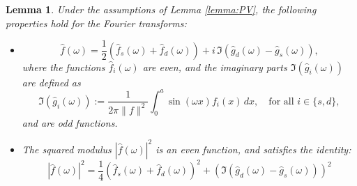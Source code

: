 \documentclass[preprint,hidelinks,authoryear]{elsarticle}
\newtheorem{Lemma}[Thm]{Lemma}
\theoremstyle{plain}
\theoremstyle{definition}
\theoremstyle{remark}
\begin{document}
\begin{Lemma}
\label{lemma:LdL}
Under the assumptions of Lemma \ref{lemma:PV}, the following properties hold for the Fourier transforms:
\begin{itemize}
    \item[(i)] 
    $$
    \hat{f}(\omega) = \frac{1}{2} \left(  \hat{f}_s(\omega) + \hat{f}_d(\omega) \right) + i \, \Im(\hat{g}_d(\omega) - \hat{g}_s(\omega)),
    $$
    where the functions $\hat{f}_i(\omega)$ are even, and the imaginary parts $\Im(\hat{g}_i(\omega))$ are defined as
    $$
    \Im(\hat{g}_i(\omega)) := \frac{1}{2\pi \|f\|^2} \int_{0}^{a} \sin(\omega x) f_i(x) \, dx, \quad \text{for all } i \in \{s,d\},
    $$
    and are odd functions.
    \item[(ii)] The squared modulus $|\hat{f}(\omega)|^2$ is an even function, and satisfies the identity:
    \begin{equation}
    |\hat{f}(\omega)|^2 = \frac{1}{4} \left( \hat{f}_s(\omega) + \hat{f}_d(\omega) \right)^2 + \left( \Im(\hat{g}_d(\omega) - \hat{g}_s(\omega)) \right)^2
    \label{eqmoduloquadrofourier}
    \end{equation}
\end{itemize}
\end{Lemma}
\end{document}
